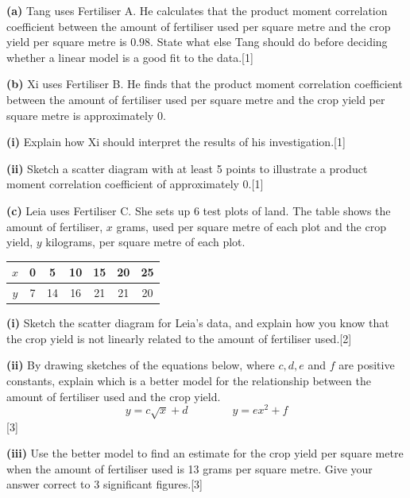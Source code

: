 \documentclass[a4paper,11pt,oneside]{article}
\newcommand{\partlabel}[1]{\par\needspace{3\baselineskip}\smallskip\noindent\textbf{#1}\quad}
\newcommand{\mk}[1]{\hfill[#1]}
\begin{document}
\partlabel{(a)}
Tang uses Fertiliser A. He calculates that the product moment correlation coefficient between the amount of fertiliser used per square metre and the crop yield per square metre is $0.98$.
State what else Tang should do before deciding whether a linear model is a good fit to the data.\mk{1}



\partlabel{(b)}
Xi uses Fertiliser B. He finds that the product moment correlation coefficient between the amount of fertiliser used per square metre and the crop yield per square metre is approximately $0$.

\partlabel{(i)}
Explain how Xi should interpret the results of his investigation.\mk{1}



\partlabel{(ii)}
Sketch a scatter diagram with at least 5 points to illustrate a product moment correlation coefficient of approximately $0$.\mk{1}



\partlabel{(c)}
Leia uses Fertiliser C. She sets up 6 test plots of land. The table shows the amount of fertiliser, $x$ grams, used per square metre of each plot and the crop yield, $y$ kilograms, per square metre of each plot.

\begin{center}
\begin{tabular}{c|cccccc}
$x$ & 0 & 5 & 10 & 15 & 20 & 25 \\
\hline
$y$ & 7 & 14 & 16 & 21 & 21 & 20
\end{tabular}
\end{center}

\partlabel{(i)}
Sketch the scatter diagram for Leia's data, and explain how you know that the crop yield is not linearly related to the amount of fertiliser used.\mk{2}



\partlabel{(ii)}
By drawing sketches of the equations below, where $c,d,e$ and $f$ are positive constants, explain which is a better model for the relationship between the amount of fertiliser used and the crop yield.
\[ y = c\sqrt{x} + d \qquad\qquad y = ex^2 + f \]
\mk{3}



\partlabel{(iii)}
Use the better model to find an estimate for the crop yield per square metre when the amount of fertiliser used is 13 grams per square metre. Give your answer correct to 3 significant figures.\mk{3}
\end{document}
